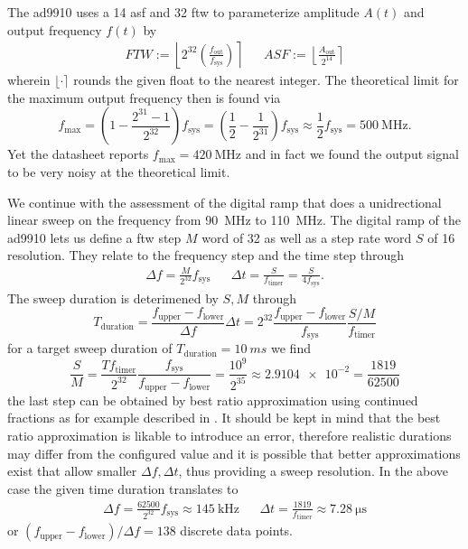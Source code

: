 The \gls{ad9910} uses a \SI{14}{\bit} \gls{asf} and \SI{32}{\bit} \gls{ftw}
to parameterize amplitude $A(t)$ and output frequency $f(t)$ by
\begin{align}
  FTW
  :=
  \left\lfloor2^{32}\left(\frac{f_\text{out}}{f_\text{sys}}\right)\right\rceil
  &&
  ASF
  :=
  \left\lfloor\frac{A_\text{out}}{2^{14}}\right\rceil
  \label{eq:elec:ftwasf}
\end{align}
wherein $\lfloor{\cdot}\rceil$ rounds the given float to the nearest integer.
The theoretical limit for the maximum output frequency then is found via
\begin{equation*}
  f_\text{max}
  =
  \left(1-\frac{2^{31}-1}{2^{32}}\right)f_\text{sys}
  =
  \left(\frac{1}{2}-\frac{1}{2^{31}}\right)f_\text{sys}
  \approx
  \frac{1}{2}f_\text{sys}
  =
  \SI{500}{\mega\hertz}.
\end{equation*}
Yet the datasheet \cite{AD9910} reports $f_\text{max}=\SI{420}{\mega\hertz}$
and in fact we found the output signal to be very noisy at the theoretical
limit.

We continue with the assessment of the digital ramp that does a unidrectional
linear sweep on the frequency from \SI{90}{\mega\hertz} to
\SI{110}{\mega\hertz}. The digital ramp of the \gls{ad9910} lets us define
a \gls{ftw} step $M$ word of \SI{32}{\bit} as well as a step rate word $S$ of
\SI{16}{\bit} resolution. They relate to the frequency step and the time
step through
\begin{align}
  \Delta f
  =
  \frac{M}{2^{32}}f_\text{sys}
  &&
  \Delta t
  =
  \frac{S}{f_\text{timer}}
  =
  \frac{S}{4f_\text{sys}}.
  \label{eq:elec:step}
\end{align}
The sweep duration is deterimened by $S,M$ through
\begin{equation}
  T_\text{duration}
  =
  \frac{f_\text{upper}-f_\text{lower}}{\Delta f}\Delta t
  =
  2^{32}\frac{f_\text{upper}-f_\text{lower}}{f_\text{sys}}\frac{S/M}{f_\text{timer}}
\end{equation}
for a target sweep duration of $T_\text{duration}=\SI{10}{ms}$ we find
\begin{equation*}
  \frac{S}{M}
  =
  \frac{T f_\text{timer}}{2^{32}}\frac{f_\text{sys}}{f_\text{upper}-f_\text{lower}}
  =
  \frac{10^9}{2^{35}}
  \approx
  \num{2.9104e-2}
  =
  \frac{1819}{62500}
\end{equation*}
the last step can be obtained by best ratio approximation using continued
fractions as for example described in \cite{Ashley2003}. It should be kept in
mind that the best ratio approximation is likable to introduce an error,
therefore realistic durations may differ from the configured value and it
is possible that better approximations exist that allow smaller $\Delta f,
\Delta t$, thus providing a sweep resolution. In the above case the given
time duration translates to
\begin{align*}
  \Delta f
  =
  \frac{62500}{2^{32}}f_\text{sys}
  \approx
  \SI{145}{\kilo\hertz}
  &&
  \Delta t
  =
  \frac{1819}{f_\text{timer}}
  \approx
  \SI{7.28}{\micro\second}
\end{align*}
or $(f_\text{upper}-f_\text{lower})/\Delta f=138$ discrete data points.

